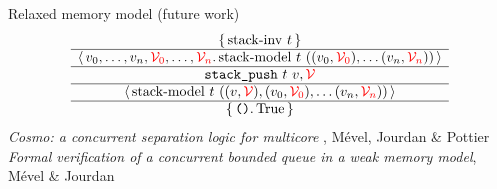 \begin{frame}{Relaxed memory model (future work)}
\centering
\large
\[
    \begin{array}{c} \left\lbrace\, 
      \mathrm{stack {\hbox{-}} inv}\ t
     \,\right\rbrace \\ \hline \left\langle\, 
      v_0, \dots, v_n, \textcolor{red}{\mathcal{V}_0}, \dots, \textcolor{red}{\mathcal{V}_n}
     \ldotp 
      \mathrm{stack {\hbox{-}} model}\ t\ ((v_0, \textcolor{red}{\mathcal{V}_0}), \dots (v_n, \textcolor{red}{\mathcal{V}_n}))
     \,\right\rangle \\ \hline 
      \texttt{stack\_push}\ t\ v, \textcolor{red}{\mathcal{V}}
     \\ \hline \left\langle\, 
      \mathrm{stack {\hbox{-}} model}\ t\ ((v, \textcolor{red}{\mathcal{V}}), (v_0, \textcolor{red}{\mathcal{V}_0}), \dots (v_n, \textcolor{red}{\mathcal{V}_n}))
     \,\right\rangle \\ \hline \left\lbrace\, 
      \texttt{()}
     \ldotp 
      \mathrm{True}
     \,\right\rbrace \end{array}
\]
\vfill
\normalsize
\emph{Cosmo: a concurrent separation logic for multicore \OCaml}, Mével, Jourdan \& Pottier \\
\medskip
\emph{Formal verification of a concurrent bounded queue in a weak memory model}, Mével \& Jourdan
\end{frame}